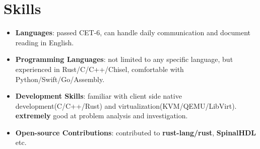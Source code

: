 \documentclass{resume}
\newcommand{\en}[1]{#1}
\newcommand{\zh}[1]{}
\begin{document}
\section{\en{Skills}\zh{技能}}
\begin{itemize}[parsep=0.25ex]
      \item \en{\textbf{Languages}:
                  passed CET-6, can handle daily communication and document reading in English.
            }
            \zh{\textbf{语言}:
                  通过英语六级（525分），可以使用英语进行日常交流以及技术文档的阅读。
            }
      \item \en{\textbf{Programming Languages}:
                  not limited to any specific language,
                  but experienced in Rust/C/C++/Chisel,
                  comfortable with Python/Swift/Go/Assembly.
            }
            \zh{\textbf{编程语言}:
                  不局限于特定编程语言，熟悉 Rust/C/C++/Chisel 等，
                  了解 Python/Swift/Go/Assembly 等。
            }
      \item \en{\textbf{Development Skills}:
                  familiar with client side native development(C/C++/Rust) and virtualization(KVM/QEMU/LibVirt). \textbf{extremely} good at problem analysis and investigation.
            }
            \zh{\textbf{开发技能}:
                  熟悉客户端 native 开发(C/C++/Rust，全平台)以及虚拟化技术（KVM、QEMU、LibVirt）。分析定位问题能力尤其突出。
            }
      \item \en{\textbf{Open-source Contributions}:
                  contributed to \textbf{rust-lang/rust}, \textbf{SpinalHDL} etc.
            }
            \zh{\textbf{开源贡献}:
                  为 \textbf{rust-lang/rust}, \textbf{SpinalHDL} 等项目贡献过代码。
            }
\end{itemize}
\end{document}
